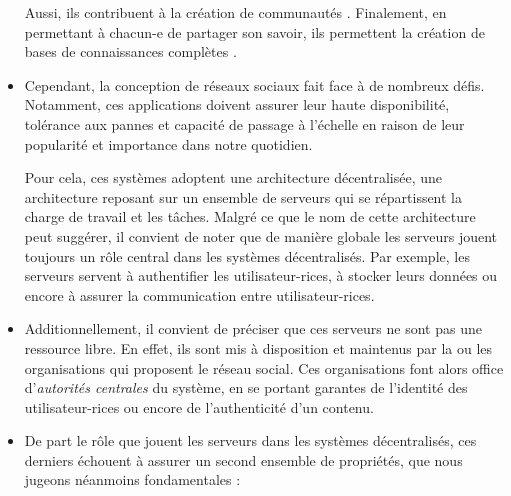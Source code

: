 \begin{itemize}
      Aussi, ils contribuent à la création de communautés \cite{2013-understanding-social-media-logic-van-dijck}.
      Finalement, en permettant à chacun-e de partager son savoir, ils permettent la création de bases de connaissances complètes \cite{2005-internet-encyclopaedias-head-to-head,2008-knowledge-sharing-yahoo-answers-adamic}.
    \item Cependant, la conception de réseaux sociaux fait face à de nombreux défis.
      Notamment, ces applications doivent assurer leur haute disponibilité, tolérance aux pannes et capacité de passage à l'échelle en raison de leur popularité et importance dans notre quotidien.
      \begin{definition}[Disponibilité]
          \label{def:availability}
      \end{definition}
      \begin{definition}
      \end{definition}
      \begin{definition}
      \end{definition}
      Pour cela, ces systèmes adoptent une architecture décentralisée\footnotemark, \ie une architecture reposant sur un ensemble de serveurs qui se répartissent la charge de travail et les tâches.
      Malgré ce que le nom de cette architecture peut suggérer, il convient de noter que de manière globale les serveurs jouent toujours un rôle central dans les systèmes décentralisés.
      Par exemple, les serveurs servent à authentifier les utilisateur-rices, à stocker leurs données ou encore à assurer la communication entre utilisateur-rices.
    \item Additionnellement, il convient de préciser que ces serveurs ne sont pas une ressource libre.
      En effet, ils sont mis à disposition et maintenus par la ou les organisations qui proposent le réseau social.
      Ces organisations font alors office d'\emph{autorités centrales} du système, \eg en se portant garantes de l'identité des utilisateur-rices ou encore de l'authenticité d'un contenu.
    \item De part le rôle que jouent les serveurs dans les systèmes décentralisés, ces derniers échouent à assurer un second ensemble de propriétés, que nous jugeons néanmoins fondamentales :
      \begin{definition}

\end{definition}
\end{itemize}
